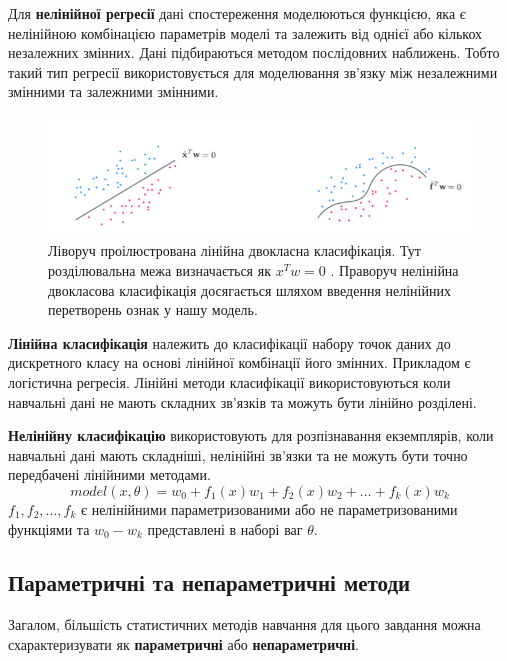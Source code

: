 \documentclass[14pt,a4paper]{extarticle}
\newcounter{e}
\numberwithin{equation}{section}
\numberwithin{figure}{section}
\begin{document}
    Для \textbf{нелінійної регресії} дані спостереження моделюються функцією, яка є нелінійною комбінацією параметрів моделі та залежить від однієї або кількох незалежних змінних. Дані підбираються методом послідовних наближень. Тобто такий тип регресії використовується для моделювання зв'язку між незалежними змінними та залежними змінними. \newline
	\begin{figure}[h]
        \centering
        \includegraphics[width=0.9 \textwidth]{images/7.png}
        \caption{Ліворуч проілюстрована лінійна двокласна класифікація. Тут розділювальна межа визначається як $x^T w=0$ . Праворуч нелінійна двокласова класифікація досягається шляхом введення нелінійних перетворень ознак у нашу модель.}
        \label{fig:7}
    \end{figure}
    
    \textbf{Лінійна класифікація} належить до класифікації набору точок даних до дискретного класу на основі лінійної комбінації його змінних. Прикладом є логістична регресія. Лінійні методи класифікації використовуються коли навчальні дані не мають складних зв'язків та можуть бути лінійно розділені. \newline
    
    \textbf{Нелінійну класифікацію} використовують для розпізнавання екземплярів, коли навчальні дані мають складніші, нелінійні зв'язки та не можуть бути точно передбачені лінійними методами. 
    $$
    model(x, \theta) = w_{0} + f_{1}(x)w_{1} + f_{2}(x)w_{2} + \dots + f_{k}(x)w_{k}
    $$  
    $f_{1},f_{2},\dots,f_{k}$ є нелінійними параметризованими або не параметризованими функціями та $w_{0}-w_{k}$ представлені в наборі ваг $\theta$.
    
    \subsection{Параметричні та непараметричні методи}
    
    Загалом, більшість статистичних методів навчання для цього завдання можна схарактеризувати як \textbf{параметричні} або \textbf{непараметричні}. \newline
\end{document}
